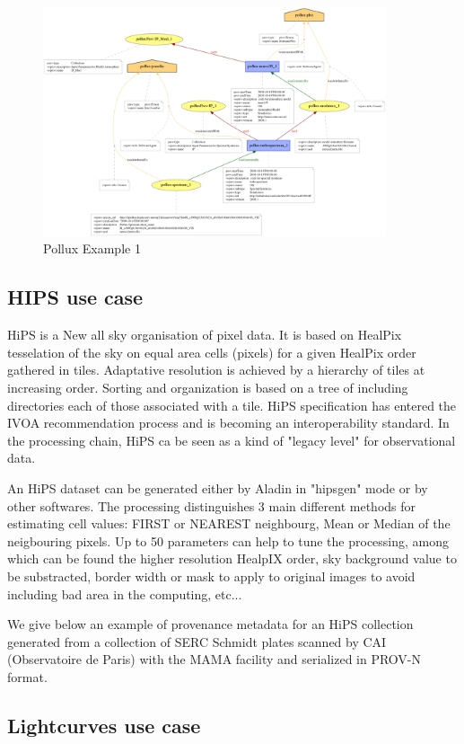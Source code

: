 \begin{figure}
\centering
\includegraphics[width=0.9\textwidth]{usecase_Pollux_example1.png}
\caption{Pollux Example 1}
\label{fig:pollux}
\end{figure}

\subsection{HIPS use case}
HiPS is a New all sky organisation of pixel data. It is based on HealPix tesselation of the sky on equal area cells (pixels) for a given HealPix order  gathered in tiles. Adaptative resolution is achieved by a hierarchy of tiles at increasing order. Sorting and organization is based on a tree of including directories each of those associated with a tile. HiPS specification has entered the IVOA recommendation process and is becoming an interoperability standard.
In the processing chain, HiPS ca be seen as a kind of "legacy level" for observational data.

An HiPS dataset can be generated either by Aladin in "hipsgen" mode or by other softwares.  The processing distinguishes 3 main different methods for estimating cell values: FIRST or NEAREST neighbourg, Mean or Median of the neigbouring pixels. Up to 50 parameters can help to tune the processing, among which can be found the higher resolution HealpIX order, sky background value to be substracted, border width or mask to apply to original images to avoid including bad area in the computing, etc...

We give below an example of provenance metadata for an HiPS collection generated from a collection of SERC Schmidt plates scanned by CAI (Observatoire de Paris) with the MAMA facility and serialized   in PROV-N format.
 
\subsection{Lightcurves use case}

